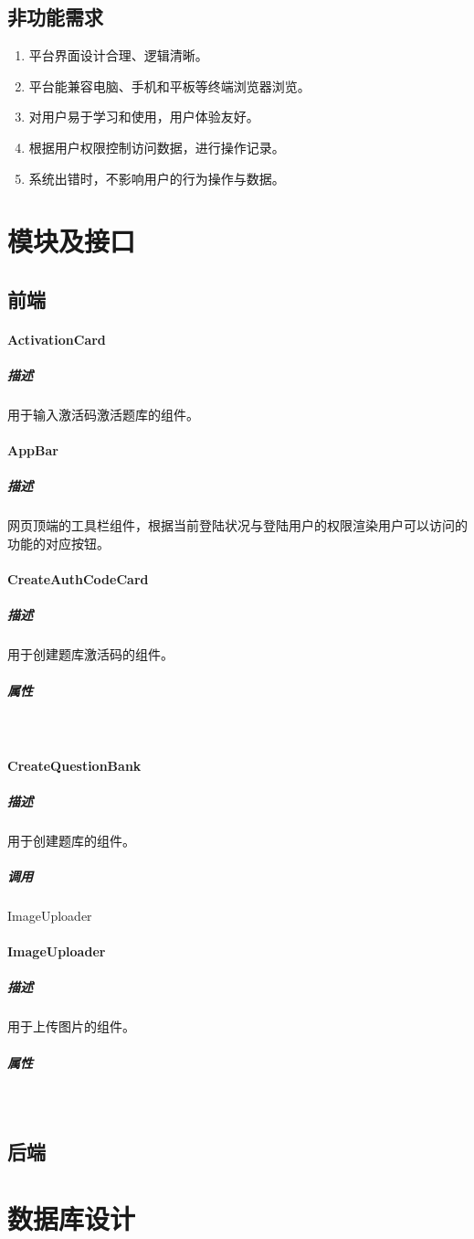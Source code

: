 \documentclass{article}
\begin{document}
    \subsection{非功能需求}
		\begin{enumerate}
			\item 平台界面设计合理、逻辑清晰。
			\item 平台能兼容电脑、手机和平板等终端浏览器浏览。
			\item 对用户易于学习和使用，用户体验友好。
			\item 根据用户权限控制访问数据，进行操作记录。
			\item 系统出错时，不影响用户的行为操作与数据。
		\end{enumerate}
		
\section{模块及接口}
    \subsection{前端}
    	\paragraph{ActivationCard}
    		\subparagraph{描述}
    			用于输入激活码激活题库的组件。
    	\paragraph{AppBar}
    		\subparagraph{描述}
    			网页顶端的工具栏组件，根据当前登陆状况与登陆用户的权限渲染用户可以访问的功能的对应按钮。
    	\paragraph{CreateAuthCodeCard}
    		\subparagraph{描述}
    			用于创建题库激活码的组件。
    		\subparagraph{属性}\ \par
    	\paragraph{CreateQuestionBank}
    		\subparagraph{描述}
    			用于创建题库的组件。
    		\subparagraph{调用}
    			ImageUploader
    	\paragraph{ImageUploader}
	    	\subparagraph{描述}
	    		用于上传图片的组件。
	    	\subparagraph{属性}\ \par
    \subsection{后端}
    
\section{数据库设计}
\end{document}

